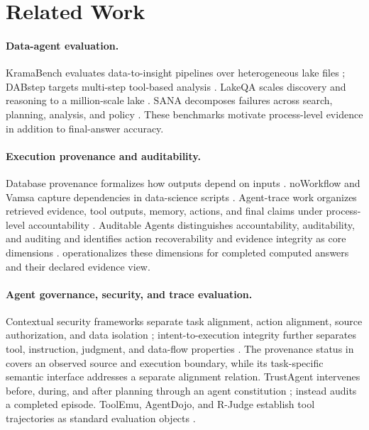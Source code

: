 \section{Related Work}\label{sec:related}

\paragraph{Data-agent evaluation.}
KramaBench evaluates data-to-insight pipelines over heterogeneous lake files \citep{kramabench2025}; DABstep targets multi-step tool-based analysis \citep{dabstep2025}. LakeQA scales discovery and reasoning to a million-scale lake \citep{lakeqa2026}. SANA decomposes failures across search, planning, analysis, and policy \citep{sana2026}. These benchmarks motivate process-level evidence in addition to final-answer accuracy.

\paragraph{Execution provenance and auditability.}
Database provenance formalizes how outputs depend on inputs \citep{green2007provenance,cheney2009provenance,amsterdamer2011aggregate}. noWorkflow and Vamsa capture dependencies in data-science scripts \citep{murta2014noworkflow,namaki2020vamsa}. Agent-trace work organizes retrieved evidence, tool outputs, memory, actions, and final claims under process-level accountability \citep{agenttrace2026}. Auditable Agents distinguishes accountability, auditability, and auditing and identifies action recoverability and evidence integrity as core dimensions \citep{nian2026auditable}. \ledger operationalizes these dimensions for completed computed answers and their declared evidence view.

\paragraph{Agent governance, security, and trace evaluation.}
Contextual security frameworks separate task alignment, action alignment, source authorization, and data isolation \citep{siu2026security}; intent-to-execution integrity further separates tool, instruction, judgment, and data-flow properties \citep{qu2026intent}. The provenance status in \ledger covers an observed source and execution boundary, while its task-specific semantic interface addresses a separate alignment relation. TrustAgent intervenes before, during, and after planning through an agent constitution \citep{hua2024trustagent}; \ledger instead audits a completed episode. ToolEmu, AgentDojo, and R-Judge establish tool trajectories as standard evaluation objects \citep{ruan2024toolemu,debenedetti2024agentdojo,yuan2024rjudge}.

